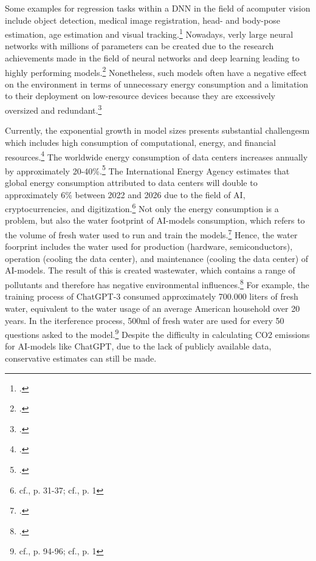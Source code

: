 Some examples for regression tasks within a \ac{DNN} in the field of acomputer vision include object detection, medical image registration, head- and body-pose estimation, age estimation and visual tracking.\footcite[cf.][325-326]{gustafssonEnergyBasedModelsDeep2020}
Nowadays, verly large neural networks with millions of parameters can be created due to the research achievements made in the field of neural networks and deep learning leading to highly performing models.\footcite[cf.][152]{marinoDeepNeuralNetworks2023}
Nonetheless, such models often have a negative effect on the environment in terms of unnecessary energy consumption and a limitation to their deployment on low-resource devices because they are excessively oversized and redundant.\footcite[cf.][152]{marinoDeepNeuralNetworks2023}

Currently, the exponential growth in model sizes presents substantial challengesm which includes high consumption of computational, energy, and financial resources.\footcite[cf.][1-2]{baiEfficiencySystematicSurvey2024}
The worldwide energy consumption of data centers increases annually by approximately 20-40\%.\footcite[cf.][1]{hintemannDataCenters20212022} 
The International Energy Agency estimates that global energy consumption attributed to data centers will double to approximately 6\% between 2022 and 2026 due to the field of AI, cryptocurrencies, and digitization.\footnote{cf.\cite{anon.Electricity2024Analysis2024}, p. 31-37; cf.\cite{jacksonAIBoomWill2024}, p. 1}
Not only the energy consumption is a problem, but also the water footprint of AI-models consumption, which refers to the volume of fresh water used to run and train the models.\footcite[cf.][92-93]{georgeEnvironmentalImpactAI2023}
Hence, the water foorprint includes the water used for production (hardware, semiconductors), operation (cooling the data center), and maintenance (cooling the data center) of AI-models.
The result of this is created wastewater, which contains a range of pollutants and therefore has negative environmental influences.\footcite[cf.][94-96]{georgeEnvironmentalImpactAI2023}
For example, the training process of ChatGPT-3 consumed approximately 700.000 liters of fresh water, equivalent to the water usage of an average American household over 20 years.
In the iterference process, 500ml of fresh water are used for every 50 questions asked to the model.\footnote{cf.\cite{georgeEnvironmentalImpactAI2023}, p. 94-96; cf.\cite{anon.AIProgramsConsume}, p. 1}
Despite the difficulty in calculating CO2 emissions for AI-models like ChatGPT, due to the lack of publicly available data, conservative estimates can still be made.

